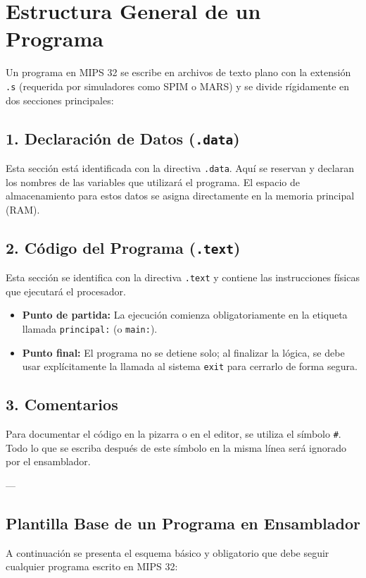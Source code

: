 \documentclass[12pt,a4paper]{article}
\begin{document}
\section*{Estructura General de un Programa}
Un programa en MIPS 32 se escribe en archivos de texto plano con la extensión \texttt{.s} (requerida por simuladores como SPIM o MARS) y se divide rígidamente en dos secciones principales:

\subsection*{1. Declaración de Datos (\texttt{.data})}
Esta sección está identificada con la directiva \texttt{.data}. Aquí se reservan y declaran los nombres de las variables que utilizará el programa. El espacio de almacenamiento para estos datos se asigna directamente en la memoria principal (RAM).

\subsection*{2. Código del Programa (\texttt{.text})}
Esta sección se identifica con la directiva \texttt{.text} y contiene las instrucciones físicas que ejecutará el procesador. 
\begin{itemize}
    \item \textbf{Punto de partida:} La ejecución comienza obligatoriamente en la etiqueta llamada \texttt{principal:} (o \texttt{main:}).
    \item \textbf{Punto final:} El programa no se detiene solo; al finalizar la lógica, se debe usar explícitamente la llamada al sistema \texttt{exit} para cerrarlo de forma segura.
\end{itemize}

\subsection*{3. Comentarios}
Para documentar el código en la pizarra o en el editor, se utiliza el símbolo \texttt{\#}. Todo lo que se escriba después de este símbolo en la misma línea será ignorado por el ensamblador.

---

\subsection*{Plantilla Base de un Programa en Ensamblador}
A continuación se presenta el esquema básico y obligatorio que debe seguir cualquier programa escrito en MIPS 32:
\end{document}
